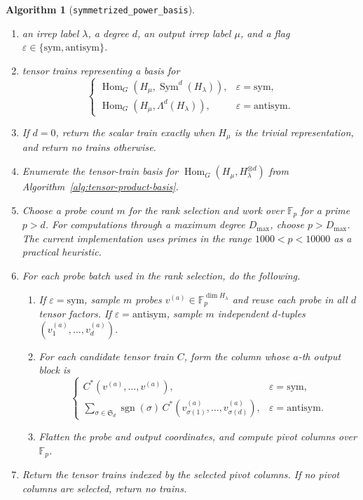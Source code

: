 \documentclass[11pt]{article}
\newcommand{\dsF}{\mathbb{F}}
\newcommand{\HomG}[2]{\operatorname{Hom}_G\!\left(#1,#2\right)}
\newcommand{\Sym}{\operatorname{Sym}}
\newtheorem{algorithm}[theorem]{Algorithm}
\theoremstyle{definition}
\begin{document}
\begin{algorithm}[\texttt{symmetrized\_power\_basis}]\label{alg:symmetrized-power-basis}
  \phantom{}
  \begin{enumerate}[label=\textbf{Step \arabic*.},leftmargin=2.8cm]
    \item[\textbf{Input:}] an irrep label $\lambda$, a degree $d$, an output irrep label $\mu$, and a flag $\varepsilon\in\{\mathrm{sym},\mathrm{antisym}\}$.
    \item[\textbf{Output:}] tensor trains representing a basis for
    \[
      \begin{cases}
        \HomG{H_\mu}{\Sym^d(H_\lambda)}, & \varepsilon=\mathrm{sym},\\
        \HomG{H_\mu}{\Lambda^d(H_\lambda)}, & \varepsilon=\mathrm{antisym}.
      \end{cases}
    \]
    \item If $d=0$, return the scalar train exactly when $H_\mu$ is the trivial representation, and return no trains otherwise.
    \item Enumerate the tensor-train basis for $\HomG{H_\mu}{H_\lambda^{\otimes d}}$ from Algorithm~\ref{alg:tensor-product-basis}.
    \item Choose a probe count $m$ for the rank selection and work over $\dsF_p$ for a prime $p>d$.
    For computations through a maximum degree $D_{\max}$, choose $p>D_{\max}$.
    The current implementation uses primes in the range $1000<p<10000$ as a practical heuristic.
    \item For each probe batch used in the rank selection, do the following.
    \begin{enumerate}[label=\textup{(\alph*)},leftmargin=1.4cm]
      \item If $\varepsilon=\mathrm{sym}$, sample $m$ probes $v^{(a)}\in\dsF_p^{\dim H_\lambda}$ and reuse each probe in all $d$ tensor factors.
      If $\varepsilon=\mathrm{antisym}$, sample $m$ independent $d$-tuples $(v_1^{(a)},\dots,v_d^{(a)})$.
      \item For each candidate tensor train $C$, form the column whose $a$-th output block is
      \[
        \begin{cases}
          C^*(v^{(a)},\dots,v^{(a)}), & \varepsilon=\mathrm{sym},\\
          \displaystyle
          \sum_{\sigma\in\mathfrak S_d}\operatorname{sgn}(\sigma)\,
          C^*(v_{\sigma(1)}^{(a)},\dots,v_{\sigma(d)}^{(a)}),
          & \varepsilon=\mathrm{antisym}.
        \end{cases}
      \]
      \item Flatten the probe and output coordinates, and compute pivot columns over $\dsF_p$.
    \end{enumerate}
    \item Return the tensor trains indexed by the selected pivot columns.
    If no pivot columns are selected, return no trains.
  \end{enumerate}
\end{algorithm}
\end{document}
